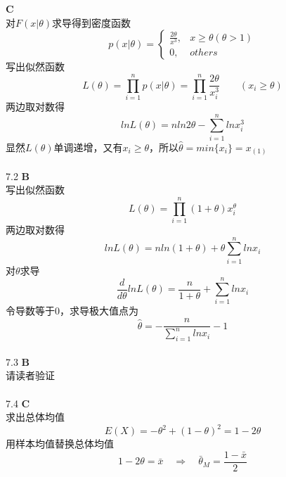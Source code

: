\documentclass[a4paper]{ctexart}    %
\begin{document}
	\newpage 
	 \quad \textbf{C} \\
	对$ F(x|\theta) $求导得到密度函数
	\begin{equation*}
		p(x|\theta) = 
		\begin{cases}
			\frac{2\theta}{x^3}, & x \geq \theta (\theta > 1) \\
			0, & others
		\end{cases}
	\end{equation*}
	写出似然函数
	\begin{equation*}
		L(\theta) = \prod\limits_{i=1}^{n} p(x|\theta) = \prod\limits_{i=1}^{n} \frac{2\theta}{x_i^3} \qquad (x_i \geq \theta)
	\end{equation*}
	两边取对数得
	\begin{equation*}
		lnL(\theta) = nln2\theta - \sum\limits_{i=1}^{n}lnx_i^3
	\end{equation*}
	显然$ L(\theta) $单调递增，又有$ x_i \geq \theta $，所以$ \hat{\theta} = min\{x_i\} = x_{(1)} $ \\
	\\
	7.2 \quad \textbf{B} \\
	写出似然函数
	\begin{equation*}
		L(\theta) = \prod\limits_{i=1}^{n} (1+\theta)x_i^{\theta}
	\end{equation*}
	两边取对数得
	\begin{equation*}
		lnL(\theta) = nln(1+\theta) + \theta \sum\limits_{i=1}^{n} lnx_i
	\end{equation*}
	对$ \theta $求导
	\begin{equation*}
		\frac{d}{d\theta} lnL(\theta) = \frac{n}{1+\theta} + \sum\limits_{i=1}^{n}lnx_i
	\end{equation*}
	令导数等于0，求导极大值点为
	\begin{equation*}
		\hat{\theta} = -\frac{n}{\sum\limits_{i=1}^{n}lnx_i} - 1
	\end{equation*}
	\\
	7.3 \quad \textbf{B} \\
	请读者验证 \\
	\\ 
	7.4 \quad \textbf{C} \\
	求出总体均值
	\begin{equation*}
		E(X) = -\theta^2 + (1-\theta)^2 = 1 - 2\theta 
	\end{equation*}
	用样本均值替换总体均值
	\begin{equation*}
		1 - 2\theta = \bar{x} \quad \Rightarrow \quad \bar{\theta}_M = \frac{1 - \bar{x}}{2}
	\end{equation*}
\end{document}

